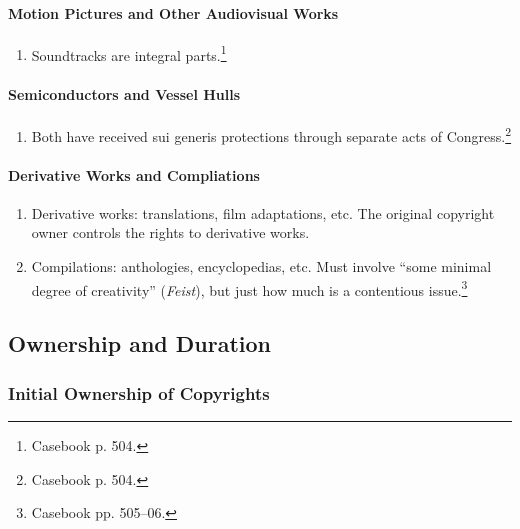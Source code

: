 \paragraph{Motion Pictures and Other Audiovisual Works}

\begin{enumerate}
    \item Soundtracks are integral parts.\footnote{Casebook p. 504.}
\end{enumerate}

\paragraph{Semiconductors and Vessel Hulls}

\begin{enumerate}
    \item Both have received sui generis protections through separate acts of 
    Congress.\footnote{Casebook p. 504.}
\end{enumerate}

\paragraph{Derivative Works and Compliations}

\begin{enumerate}
    \item Derivative works: translations, film adaptations, etc. The original 
    copyright owner controls the rights to derivative works.
    \item Compilations: anthologies, encyclopedias, etc. Must involve ``some 
    minimal degree of creativity'' (\emph{Feist}), but just how much is a 
    contentious issue.\footnote{Casebook pp. 505--06.}
\end{enumerate}

\subsection{Ownership and Duration}

\subsubsection{Initial Ownership of Copyrights}

